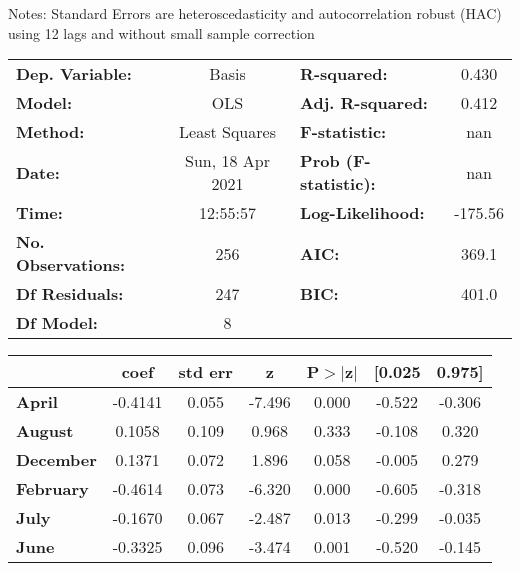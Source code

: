 Notes: \newline
 [1] Standard Errors are heteroscedasticity and autocorrelation robust (HAC) using 12 lags and without small sample correction
\begin{center}
\begin{tabular}{lclc}
\toprule
\textbf{Dep. Variable:}    &      Basis       & \textbf{  R-squared:         } &     0.430   \\
\textbf{Model:}            &       OLS        & \textbf{  Adj. R-squared:    } &     0.412   \\
\textbf{Method:}           &  Least Squares   & \textbf{  F-statistic:       } &       nan   \\
\textbf{Date:}             & Sun, 18 Apr 2021 & \textbf{  Prob (F-statistic):} &      nan    \\
\textbf{Time:}             &     12:55:57     & \textbf{  Log-Likelihood:    } &   -175.56   \\
\textbf{No. Observations:} &         256      & \textbf{  AIC:               } &     369.1   \\
\textbf{Df Residuals:}     &         247      & \textbf{  BIC:               } &     401.0   \\
\textbf{Df Model:}         &           8      & \textbf{                     } &             \\
\bottomrule
\end{tabular}
\begin{tabular}{lcccccc}
                  & \textbf{coef} & \textbf{std err} & \textbf{z} & \textbf{P$> |$z$|$} & \textbf{[0.025} & \textbf{0.975]}  \\
\midrule
\textbf{April}    &      -0.4141  &        0.055     &    -7.496  &         0.000        &       -0.522    &       -0.306     \\
\textbf{August}   &       0.1058  &        0.109     &     0.968  &         0.333        &       -0.108    &        0.320     \\
\textbf{December} &       0.1371  &        0.072     &     1.896  &         0.058        &       -0.005    &        0.279     \\
\textbf{February} &      -0.4614  &        0.073     &    -6.320  &         0.000        &       -0.605    &       -0.318     \\
\textbf{July}     &      -0.1670  &        0.067     &    -2.487  &         0.013        &       -0.299    &       -0.035     \\
\textbf{June}     &      -0.3325  &        0.096     &    -3.474  &         0.001        &       -0.520    &       -0.145     \\

\end{tabular}
\end{center}
